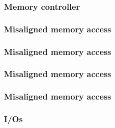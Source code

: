 \begin{frame}
  \frametitle{Memory controller}

  \begin{center}
  \end{center}

\end{frame}


\begin{frame}
  \frametitle{Misaligned memory access}

  \begin{center}
  \end{center}

\end{frame}


\begin{frame}
  \frametitle{Misaligned memory access}

  \begin{center}
  \end{center}

\end{frame}


\begin{frame}
  \frametitle{Misaligned memory access}

  \begin{center}
  \end{center}

\end{frame}


\begin{frame}
  \frametitle{Misaligned memory access}

  \begin{center}
  \end{center}

\end{frame}


\begin{frame}
  \frametitle{I/Os}

  \begin{center}
  \end{center}

\end{frame}

